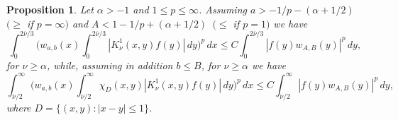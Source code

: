 \documentclass[leqno,a4paper]{amsart}
\newtheorem{Prop}{Proposition}
\newcommand{\overnu}{\overline{\nu}}
\begin{document}
\begin{Prop}
\label{Prop:P1}
Let $\alpha>-1$ and $1\le p\le\infty$. Assuming $a> -1/p-(\alpha+1/2)$
\,$(\ge$ if $p=\infty)$ and $A<1-1/p+(\alpha+1/2)$ \,$(\le$ if $p=1)$
we have
\begin{equation}
\label{ec:xyz} \int_0^{2\overnu/3}
\bigg(w_{a,b}(x)\int_0^{2\overnu/3}
|K_\nu^1(x,y)f(y)|\,dy\bigg)^p\,dx \le C
\int_0^{2\overnu/3}\left|f(y)w_{A,B}(y)\right|^p\,dy,
\end{equation}
for $\nu\ge\alpha$, while, assuming in addition $b\le B$, for $\nu\ge \alpha$
we have
\begin{equation}
\label{ec:diagonal} \int_{\overnu/2}^{\infty}
\bigg(w_{a,b}(x) \int_{\overnu/2}^{\infty}\chi_{D}(x,y)
|K_\nu^1(x,y)f(y)|\,dy\bigg)^p\,dx \le
C\int_{\overnu/2}^{\infty}\left|f(y)w_{A,B}(y)\right|^p\,dy,
\end{equation}
where $D=\{(x,y): |x-y|\le 1\}$.
\end{Prop}
\end{document}
